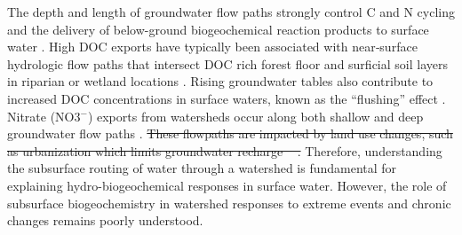 \documentclass[preprint,review, 12pt]{elsarticle}
\providecommand{\DIFdel}[1]{{\protect\color{red}\sout{#1}}}                      %
\providecommand{\DIFdelbegin}{} %
\providecommand{\DIFdelend}{} %
\newcommand{\DIFscaledelfig}{0.5}
\newlength{\DIFdelgraphicswidth} %
\newlength{\DIFdelgraphicsheight} %
\newcommand{\DIFdelincludegraphics}[2][]{%
\sbox{\DIFdelgraphicsbox}{\DIFOincludegraphics[#1]{#2}}%
\settoboxwidth{\DIFdelgraphicswidth}{\DIFdelgraphicsbox} %
\settoboxtotalheight{\DIFdelgraphicsheight}{\DIFdelgraphicsbox} %
\scalebox{\DIFscaledelfig}{%
\parbox[b]{\DIFdelgraphicswidth}{\usebox{\DIFdelgraphicsbox}\\[-\baselineskip] \rule{\DIFdelgraphicswidth}{0em}}\llap{\resizebox{\DIFdelgraphicswidth}{\DIFdelgraphicsheight}{%
\setlength{\unitlength}{\DIFdelgraphicswidth}%
\begin{picture}(1,1)%
\thicklines\linethickness{2pt} %
{\color[rgb]{1,0,0}\put(0,0){\framebox(1,1){}}}%
{\color[rgb]{1,0,0}\put(0,0){\line( 1,1){1}}}%
{\color[rgb]{1,0,0}\put(0,1){\line(1,-1){1}}}%
\end{picture}%
}\hspace*{3pt}}} %
} %
\DeclareRobustCommand{\DIFdelbegin}{\DIFOdelbegin \let\includegraphics\DIFdelincludegraphics} %
\DeclareRobustCommand{\DIFdelend}{\DIFOaddend \let\includegraphics\DIFOincludegraphics} %
\begin{document}
The depth and length of groundwater flow paths strongly control C and N cycling and the delivery of below-ground biogeochemical reaction products to surface water \citep{McDonnell2007}. High DOC exports have typically been associated with near‐surface hydrologic flow paths that intersect DOC rich forest floor and surficial soil layers in riparian or wetland locations \citep{Frank2000e,Inamdar2006}. Rising groundwater tables also contribute to increased DOC concentrations in surface waters, known as the “flushing” effect \citep{Creed2008}. Nitrate (NO3$^{-}$) exports from watersheds occur along both shallow and deep groundwater flow paths \citep{Laudon2018b,Inamdar2006,McGlynn2003}. \DIFdelbegin \DIFdel{These flowpaths are impacted by land use changes, such as urbanization which limits groundwater recharge \mbox{%
\citep{Brown2009}}\hspace{0pt}%
. }\DIFdelend Therefore, understanding the subsurface routing of water through a watershed is fundamental for explaining hydro-biogeochemical responses in surface water. However, the role of subsurface biogeochemistry in watershed responses to extreme events and chronic changes remains poorly understood.
\end{document}
